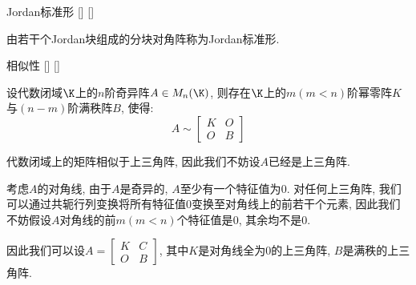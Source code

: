 \documentclass[UTF8]{ctexart}
\begin{document}
		\begin{dfn}
			[]
			{Jordan标准形}
			[]
			[]

			由若干个Jordan块组成的分块对角阵称为Jordan标准形. 
		\end{dfn}

		\begin{thm}
			[]
			{相似性}
			[]
			[]

			设代数闭域$\K$上的$n$阶奇异阵$A\in M_n(\K)$, 则存在$\K$上的$m(m<n)$阶幂零阵$K$与$(n-m)$阶满秩阵$B$, 使得: 
			\[A\sim
			\begin{bmatrix}
				K & O\\
				O & B
			\end{bmatrix}\]
		\end{thm}
		
		\begin{prf}
			代数闭域上的矩阵相似于上三角阵, 因此我们不妨设$A$已经是上三角阵. 

			考虑$A$的对角线, 由于$A$是奇异的, $A$至少有一个特征值为$0$. 对任何上三角阵, 我们可以通过共轭行列变换将所有特征值$0$变换至对角线上的前若干个元素, 因此我们不妨假设$A$对角线的前$m(m<n)$个特征值是$0$, 其余均不是$0$. 

			因此我们可以设$A=
			\begin{bmatrix}
				K & C\\
				O & B
			\end{bmatrix}$, 其中$K$是对角线全为$0$的上三角阵, $B$是满秩的上三角阵. 


\end{prf}
\end{document}

